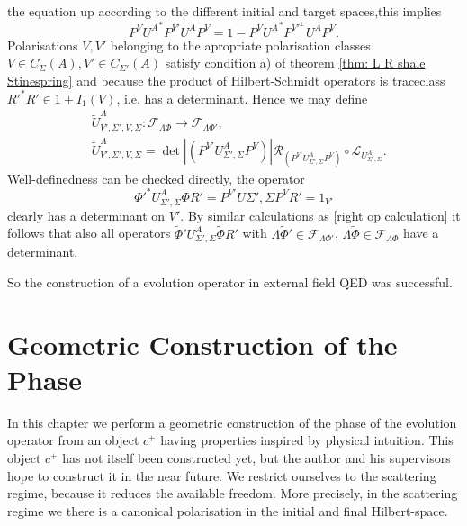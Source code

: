 \documentclass[b5paper,draft,openbib,12pt]{memoir}
\begin{document}
the equation up according to the different initial and 
target spaces,this implies 
\begin{equation}
  P^V {U^A}^* P^{V'}U^A P^V = 1- P^{V}{U^A}^* P^{{V'}^\perp} U^A P^{V}.
\end{equation}
Polarisations \(V,V'\) belonging to the apropriate polarisation 
classes \(V\in C_\Sigma(A), V'\in C_{\Sigma'}(A)\) satisfy
condition a) of 
theorem \ref{thm: L R shale Stinespring} and because 
the product of Hilbert-Schmidt operators is traceclass
 \({R'}^*R'\in 1 +I_1(V)\), i.e.
has a determinant. Hence we may define 
\begin{align}
  &\tilde{U}^A_{V',\Sigma',V,\Sigma}:\mathcal{F}_{\mathsf{\Lambda}\Phi}\rightarrow \mathcal{F}_{\mathsf{\Lambda}\Phi'},\\
  &\tilde{U}^A_{V',\Sigma',V,\Sigma}=\det|(P^{V'} U^A_{\Sigma',\Sigma} P^V)| \mathcal{R}_{(P^{V'} U^A_{\Sigma',\Sigma} P^V)} \circ \mathcal{L}_{U^A_{\Sigma',\Sigma}}.
\end{align}
Well-definedness can be checked directly, the operator
\begin{equation}
  {\Phi'}^* U^A_{\Sigma',\Sigma} \Phi R' 
  =P^{V'} U{\Sigma',\Sigma} P^{V}R' 
  = 1_{V'}
\end{equation}
clearly has a determinant on \(V'\). By similar 
calculations as \eqref{right op calculation} 
it follows that also all operators 
\(\tilde{\Phi}'U^A_{\Sigma',\Sigma} \tilde{\Phi}R'\)
with \(\mathsf{\Lambda}\tilde{\Phi}'\in \mathcal{F}_{\mathsf{\Lambda}\Phi'}\),
\(\mathsf{\Lambda}\tilde{\Phi}\in \mathcal{F}_{\mathsf{\Lambda}\Phi}\)
have a determinant.

So the construction of a evolution operator in external field 
QED was successful.


\section{Geometric Construction of the Phase}\label{chapter geometery}
In this chapter we perform a geometric construction of the phase 
of the evolution operator from an object \(c^+\) having properties 
inspired by physical intuition. This object \(c^+\) has not 
itself been constructed yet, but the author and his supervisors 
hope to construct it in the near future. 
We restrict ourselves to the scattering regime, because it reduces 
the available freedom. More precisely, in the scattering regime we 
there is a canonical polarisation in the initial and final Hilbert-space.
\end{document}
